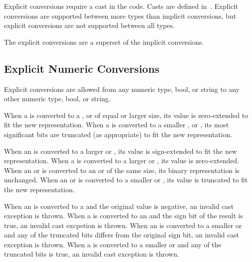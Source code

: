 Explicit conversions require a cast in the code.  Casts are defined
in~.  Explicit conversions are supported between more
types than implicit conversions, but explicit conversions are not
supported between all types.

The explicit conversions are a superset of the implicit conversions.

\subsection{Explicit Numeric Conversions}
\label{Explicit_Numeric_Conversions}

Explicit conversions are allowed from any numeric type, bool, or
string to any other numeric type, bool, or string.  

When a  is converted to a , 
or  of equal or larger size, its value is zero-extended to fit the
new representation.  When a  is converted to a
smaller ,  or , its most significant
bits are truncated (as appropriate) to fit the new representation.

When an  is converted to a larger  or , its value is
sign-extended to fit the new representation.  
When a  is converted to a larger  or , its value
is zero-extended.
When an  or  is converted to an  or 
of the same size, its binary representation is unchanged.
When an  or  is converted to a smaller 
or , its value is truncated to fit the new representation.

When an  is converted to a  and the original value is
negative, an invalid cast exception is thrown.
When a  is converted to an  and the sign bit of the result
is true, an invalid cast excpetion is thrown.
When an  is converted to a smaller  or  and any
of the truncated bits differs from the original sign bit, an invalid cast
exception is thrown.
When a  is converted to a smaller  or  and any
of the truncated bits is true, an invalid cast exception is thrown.

